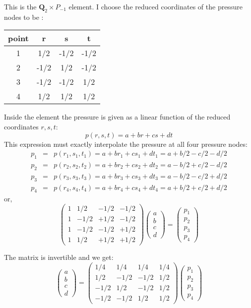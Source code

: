This is the ${\bm Q}_2\times P_{-1}$ element. 
I choose the reduced coordinates of the pressure nodes to be :

\begin{tabular}{cccc}
\hline
point & r & s & t \\
\hline
1& 1/2 &-1/2 &-1/2\\
2& -1/2 &1/2 &-1/2\\
3& -1/2 &-1/2& 1/2\\
4& 1/2 &1/2& 1/2 \\
\hline
\end{tabular}

Inside the element the pressure is given as a linear function of the reduced coordinates $r,s,t$:
\[
p(r,s,t)=a+br+cs+dt
\]
This expression must exactly interpolate the pressure at all four pressure nodes:
\begin{eqnarray}
p_1 
&=& p(r_1,s_1,t_1) 
= a+br_1+cs_1+dt_1 
= a+b/2-c/2-d/2\nonumber\\
p_2
&=& p(r_2,s_2,t_2)
= a+br_2+cs_2+dt_2
= a-b/2+c/2-d/2\nonumber\\
p_3
&=& p(r_3,s_3,t_3) 
= a+br_3+cs_3+dt_3 
= a-b/2-c/2+d/2\nonumber\\
p_4
&=& p(r_4,s_4,t_4) 
= a+br_4+cs_4+dt_4
= a+b/2+c/2+d/2\nonumber
\end{eqnarray}
or,
\begin{equation}
\left(
\begin{array}{cccc}
1 & 1/2 & -1/2 & -1/2 \\
1 & -1/2 & +1/2 & -1/2 \\
1 & -1/2 & -1/2 & +1/2 \\
1 & 1/2 & +1/2 & +1/2 
\end{array}
\right)
\left(
\begin{array}{c}
a\\b\\c\\d
\end{array}
\right)=
\left(
\begin{array}{c}
p_1\\p_2\\p_3\\p_4
\end{array}
\right)
\nonumber
\end{equation}

The matrix is invertible and we get:
\[
\left(
\begin{array}{c}
a\\b\\c\\d
\end{array}
\right)=
\left(
\begin{array}{cccc}
1/4 & 1/4 & 1/4 & 1/4 \\
1/2 & -1/2 & -1/2 & 1/2 \\
-1/2 & 1/2 & -1/2 & 1/2 \\
-1/2 & -1/2 & 1/2 & 1/2
\end{array}
\right)
\left(
\begin{array}{c}
p_1\\p_2\\p_3\\p_4
\end{array}
\right)
\]

